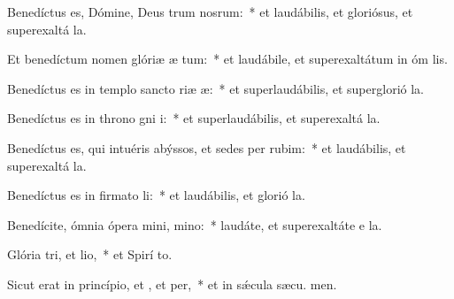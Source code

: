 \item Benedíctus es, Dómine, Deus trum nosrum:~* et laudábilis, et gloriósus, et superexaltá  la.

\item Et benedíctum nomen glóriæ æ tum:~* et laudábile, et superexaltátum in óm lis.

\item Benedíctus es in templo sancto riæ æ:~* et superlaudábilis, et superglorió  la.

\item Benedíctus es in throno gni i:~* et superlaudábilis, et superexaltá  la.

\item Benedíctus es, qui intuéris abýssos, et sedes per rubim:~* et laudábilis, et superexaltá  la.

\item Benedíctus es in firmato li:~* et laudábilis, et glorió  la.

\item Benedícite, ómnia ópera mini, mino:~* laudáte, et superexaltáte e  la.

\item Glória tri, et lio,~* et Spirí to.

\item Sicut erat in princípio, et , et per,~* et in sǽcula sæcu. men.